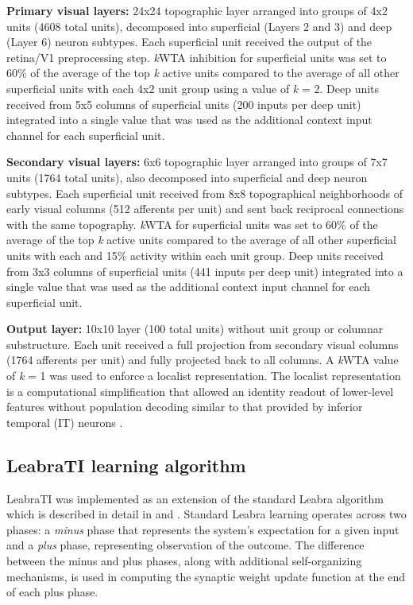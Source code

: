 \documentclass[dwyatte_dissertation.tex]{subfiles}
\begin{document}
\textbf{Primary visual layers:} 24x24 topographic layer arranged into groups of 4x2 units (4608 total units), decomposed into superficial (Layers 2 and 3) and deep (Layer 6) neuron subtypes. Each superficial unit received the output of the retina/V1 preprocessing step. \textit{k}WTA inhibition for superficial units was set to 60\% of the average of the top \textit{k} active units compared to the average of all other superficial units with each 4x2 unit group using a value of \textit{k} = 2. Deep units received from 5x5 columns of superficial units (200 inputs per deep unit) integrated into a single value that was used as the additional context input channel for each superficial unit.

\textbf{Secondary visual layers:} 6x6 topographic layer arranged into groups of 7x7 units (1764 total units), also decomposed into superficial and deep neuron subtypes. Each superficial unit received from 8x8 topographical neighborhoods of early visual columns (512 afferents per unit) and sent back reciprocal connections with the same topography. \textit{k}WTA for superficial units was set to 60\% of the average of the top \textit{k} active units compared to the average of all other superficial units with each and 15\% activity within each unit group. Deep units received from 3x3 columns of superficial units (441 inputs per deep unit) integrated into a single value that was used as the additional context input channel for each superficial unit.

\textbf{Output layer:} 10x10 layer (100 total units) without unit group or columnar substructure. Each unit received a full projection from secondary visual columns (1764 afferents per unit) and fully projected back to all columns. A \textit{k}WTA value of \textit{k} = 1 was used to enforce a localist representation. The localist representation is a computational simplification that allowed an identity readout of lower-level features without population decoding similar to that provided by inferior temporal (IT) neurons  \cite{HungKreimanPoggioEtAl05,LiCoxZoccolanEtAl09}. 

\subsection{LeabraTI learning algorithm}

LeabraTI was implemented as an extension of the standard Leabra algorithm which is described in detail in  and . Standard Leabra learning operates across two phases: a \textit{minus} phase that represents the system's expectation for a given input and a \textit{plus} phase, representing observation of the outcome. The difference between the minus and plus phases, along with additional self-organizing mechanisms, is used in computing the synaptic weight update function at the end of each plus phase. 
\end{document}
